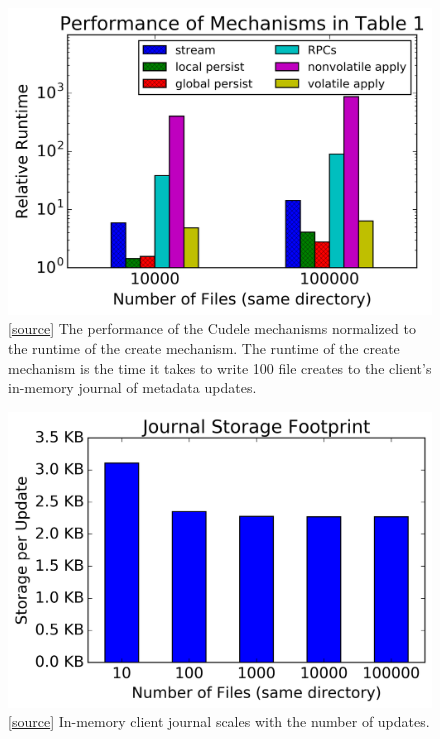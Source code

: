 \begin{figure}[tb]
\centering
\includegraphics[width=1.0\linewidth]{graphs/slowdown-mechanisms.png}
\caption{
[\href{https://github.com/michaelsevilla/cudele-popper/blob/master/viz-decoupled.ipynb}{source}]
The performance of the Cudele mechanisms normalized to the runtime of the
create mechanism. The runtime of the create mechanism is the time it takes to
write 100 file creates to the client's in-memory journal of metadata
updates.\label{fig:slowdown-mechanisms}}
\end{figure}

\begin{figure}[tb]
\centering
\includegraphics[width=1.0\linewidth]{graphs/behavior-journal-size.png}
\caption{
[\href{https://github.com/michaelsevilla/cudele-popper/blob/master/viz-decoupled.ipynb}{source}]
In-memory client journal scales with the number of
updates.\label{fig:behavior-journal-size}}
\end{figure}

